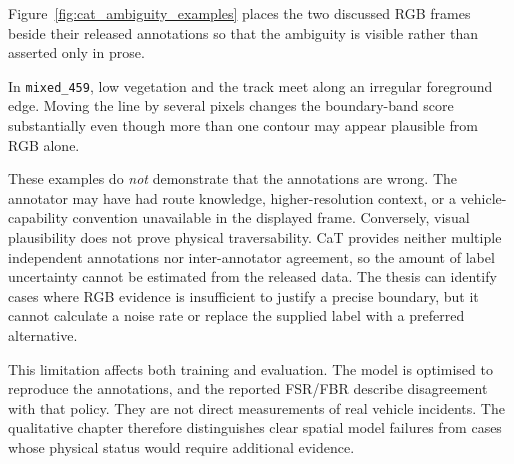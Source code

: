 Figure~\ref{fig:cat_ambiguity_examples} places the two discussed RGB frames
beside their released annotations so that the ambiguity is visible rather than
asserted only in prose.

In \texttt{mixed\_459}, low vegetation and the track meet along an irregular
foreground edge. Moving the line by several pixels changes the boundary-band
score substantially even though more than one contour may appear plausible
from RGB alone.

These examples do \emph{not} demonstrate that the annotations are wrong. The
annotator may have had route knowledge, higher-resolution context, or a
vehicle-capability convention unavailable in the displayed frame. Conversely,
visual plausibility does not prove physical traversability. CaT provides
neither multiple independent annotations nor inter-annotator agreement, so the
amount of label uncertainty cannot be estimated from the released data. The
thesis can identify cases where RGB evidence is insufficient to justify a
precise boundary, but it cannot calculate a noise rate or replace the supplied
label with a preferred alternative.

This limitation affects both training and evaluation. The model is optimised
to reproduce the annotations, and the reported FSR/FBR describe disagreement
with that policy. They are not direct measurements of real vehicle incidents.
The qualitative chapter therefore distinguishes clear spatial model failures
from cases whose physical status would require additional evidence.
